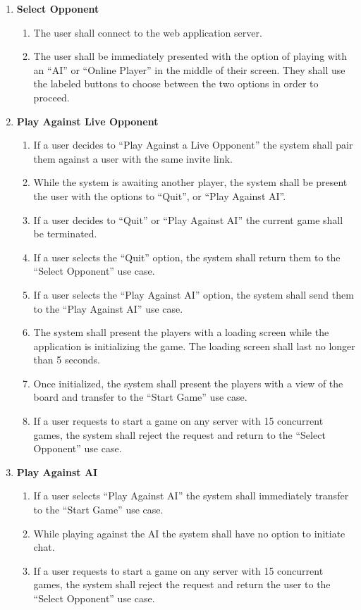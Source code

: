 \documentclass[]{article}
\begin{document}
\begin{enumerate}[{UC}1.]
	\item \textbf{Select Opponent}
	\begin{enumerate}[{FR}1.]
	    \item The user shall connect to the web application server.
		\item The user shall be immediately presented with the option of playing with an ``AI'' or ``Online Player'' in the middle of their screen. They shall use the labeled buttons to choose between the two options in order to proceed.
	\end{enumerate}
	
	\item \textbf{Play Against Live Opponent}
	\begin{enumerate}[{FR}1., resume]
		\item If a user decides to ``Play Against a Live Opponent'' the system shall pair them against a user with the same invite link.
		\item While the system is awaiting another player, the system shall be present the user with the options to ``Quit'', or ``Play Against AI''.
		\item If a user decides to ``Quit'' or ``Play Against AI'' the current game shall be terminated.
		\item If a user selects the ``Quit'' option, the system shall return them to the ``Select Opponent'' use case.
		\item If a user selects the ``Play Against AI'' option, the system shall send them to the ``Play Against AI'' use case.
		\item The system shall present the players with a loading screen while the application is initializing the game. The loading screen shall last no longer than 5 seconds.
		\item Once initialized, the system shall present the players with a view of the board and transfer to the ``Start Game'' use case.
		\item If a user requests to start a game on any server with 15 concurrent games, the system shall reject the request and return to the ``Select Opponent'' use case.
	\end{enumerate}
	
	\item \textbf{Play Against AI}
	\begin{enumerate}[{FR}1., resume]
		\item If a user selects ``Play Against AI'' the system shall immediately transfer to the ``Start Game'' use case.
        \item While playing against the AI the system shall have no option to initiate chat.
		\item If a user requests to start a game on any server with 15 concurrent games, the system shall reject the request and return the user to the ``Select Opponent'' use case.
	\end{enumerate}
	

\end{enumerate}
\end{document}
